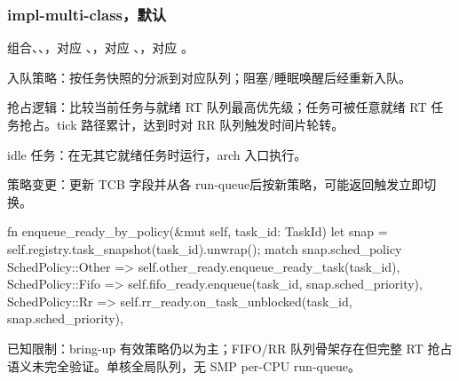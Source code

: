 
\subsubsection{impl-multi-class，默认}

组合、、，对应 、，对应 、，对应 。

入队策略：按任务快照的分派到对应队列；阻塞/睡眠唤醒后经重新入队。

抢占逻辑：比较当前任务与就绪 RT 队列最高优先级；任务可被任意就绪 RT 任务抢占。tick 路径累计，达到时对 RR 队列触发时间片轮转。

idle 任务：在无其它就绪任务时运行，arch 入口执行。

策略变更：更新 TCB 字段并从各 run-queue后按新策略，可能返回触发立即切换。

\begin{rustcode}
fn enqueue_ready_by_policy(&mut self, task_id: TaskId) {
    let snap = self.registry.task_snapshot(task_id).unwrap();
    match snap.sched_policy {
        SchedPolicy::Other => self.other_ready.enqueue_ready_task(task_id),
        SchedPolicy::Fifo => self.fifo_ready.enqueue(task_id, snap.sched_priority),
        SchedPolicy::Rr => self.rr_ready.on_task_unblocked(task_id, snap.sched_priority),
    }
}
\end{rustcode}

已知限制：bring-up 有效策略仍以为主；FIFO/RR 队列骨架存在但完整 RT 抢占语义未完全验证。单核全局队列，无 SMP per-CPU run-queue。
